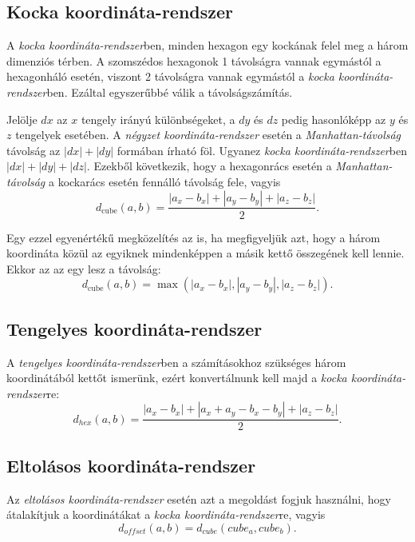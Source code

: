 \subsection{Kocka koordináta-rendszer}
\cite{redblobgamesHexagonalGrids}
\cite{HexagonalGrids}

A \textit{kocka koordináta-rendszer}ben, minden hexagon egy kockának felel meg a három dimenziós térben. A szomszédos hexagonok 1 távolságra vannak egymástól a hexagonháló esetén, viszont 2 távolságra vannak egymástól a \textit{kocka koordináta-rendszer}ben. Ezáltal egyszerűbbé válik a távolságszámítás.

Jelölje $dx$ az $x$ tengely irányú különbségeket, a $dy$ és $dz$ pedig hasonlóképp az $y$ és $z$ tengelyek esetében. A \textit{négyzet koordináta-rendszer} esetén a \textit{Manhattan-távolság} távolság az $|dx| + |dy|$ formában írható föl. Ugyanez \textit{kocka koordináta-rendszer}ben $|dx| + |dy| + |dz|$. Ezekből következik, hogy a hexagonrács esetén a \textit{Manhattan-távolság} a kockarács esetén fennálló távolság fele, vagyis
$$
d_{\text{cube}}(a, b) =
\dfrac{|a_x - b_x| + |a_y - b_y| + |a_z - b_z|}{2}.
$$

Egy ezzel egyenértékű megközelítés az is, ha megfigyeljük azt, hogy a három koordináta közül az egyiknek mindenképpen a másik kettő összegének kell lennie. Ekkor az az egy lesz a távolság:
$$
d_{\text{cube}}(a, b) =
\max(
|a_x - b_x|, |a_y - b_y|, |a_z - b_z|
).
$$

\subsection{Tengelyes koordináta-rendszer}
\cite{redblobgamesHexagonalGrids}
\cite{HexagonalGrids}

A \textit{tengelyes koordináta-rendszer}ben a számításokhoz szükséges három koordinátából kettőt ismerünk, ezért konvertálnunk kell majd a \textit{kocka koordináta-rendszer}re:
$$
d_{hex}(a, b) = \frac{|a_x - b_x| + |a_x + a_y - b_x - b_y| + |a_z - b_z|}{2}.
$$

\subsection{Eltolásos koordináta-rendszer}
\cite{redblobgamesHexagonalGrids}
\cite{HexagonalGrids}

Az \textit{eltolásos koordináta-rendszer} esetén azt a megoldást fogjuk használni, hogy átalakítjuk a koordinátákat a \textit{kocka koordináta-rendszer}re, vagyis
$$
d_{of\!fset} (a, b) = d_{cube}(cube_a, cube_b).
$$

